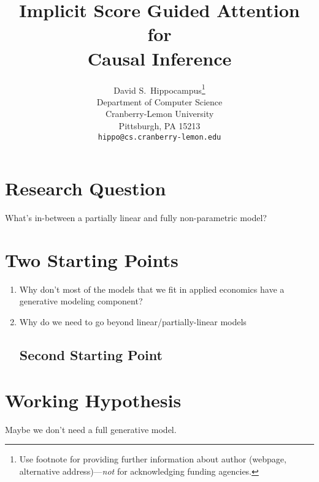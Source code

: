 \documentclass{article}
\title{Implicit Score Guided Attention for \\ Causal Inference}
\author{%
  David S.~Hippocampus\thanks{Use footnote for providing further information
    about author (webpage, alternative address)---\emph{not} for acknowledging
    funding agencies.} \\
  Department of Computer Science\\
  Cranberry-Lemon University\\
  Pittsburgh, PA 15213 \\
  \texttt{hippo@cs.cranberry-lemon.edu} \\
}
\begin{document}
\maketitle


 


\section{Research Question}
What's in-between a partially linear and fully non-parametric model?


\section{Two Starting Points}
\begin{enumerate}
    \item Why don't most of the models that we fit in applied economics have a generative modeling component? 
    \item Why do we need to go beyond linear/partially-linear models
    
\subsection{Second Starting Point}
\end{enumerate}


\section{Working Hypothesis}
Maybe we don't need a full generative model.
\end{document}
